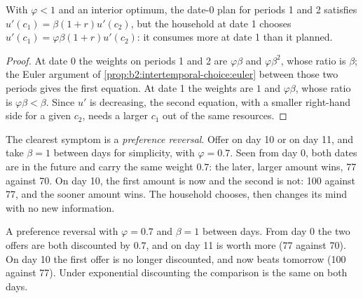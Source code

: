 \begin{proposition}\label{prop:b2:intertemporal-choice:inconsistent}
With $\varphi < 1$ and an interior optimum, the date-0 plan for periods 1 and 2 satisfies $u'(c_1) =
\beta(1 + r)u'(c_2)$, but the household at date 1 chooses $u'(c_1) = \varphi\beta(1 + r)u'(c_2)$: it
consumes more at date 1 than it planned.
\end{proposition}

\begin{proof}
At date 0 the weights on periods 1 and 2 are $\varphi\beta$ and $\varphi\beta^2$, whose ratio is
$\beta$; the Euler argument of \cref{prop:b2:intertemporal-choice:euler} between those two periods
gives the first equation. At date 1 the weights are $1$ and $\varphi\beta$, whose ratio is $\varphi\beta
< \beta$. Since $u'$ is decreasing, the second equation, with a smaller right-hand side for a given
$c_2$, needs a larger $c_1$ out of the same resources.
\end{proof}

The clearest symptom is a \emph{preference reversal}. Offer  on day 10 or  on day
11, and take $\beta = 1$ between days for simplicity, with $\varphi = 0.7$. Seen from day 0, both dates
are in the future and carry the same weight $0.7$: the later, larger amount wins, 77 against 70. On
day 10, the first amount is now and the second is not: 100 against 77, and the sooner amount wins. The
household chooses, then changes its mind with no new information.

\begin{omfigure}

{\small A preference reversal with $\varphi = 0.7$ and $\beta = 1$ between days. From day 0 the two
offers are both discounted by $0.7$, and  on day 11 is worth more (77 against 70). On day 10
the first offer is no longer discounted, and  now beats  tomorrow (100 against 77).
Under exponential discounting the comparison is the same on both days.}
\end{omfigure}

